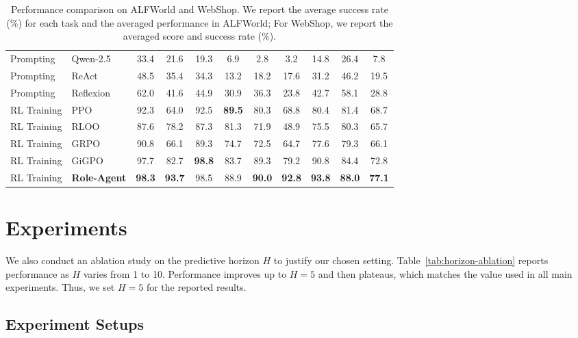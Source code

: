 \documentclass[11pt]{article}
\begin{document}
\begin{table}[t]
\begin{center}
{\begin{tabular}{ll|ccccccccc}
Prompting & Qwen-2.5 & 33.4 & 21.6 & 19.3 & 6.9 & 2.8 & 3.2 & \multicolumn{1}{c|}{14.8} & 26.4 & 7.8 \\
Prompting & ReAct & 48.5 & 35.4 & 34.3 & 13.2 & 18.2 & 17.6 & \multicolumn{1}{c|}{31.2} & 46.2 & 19.5 \\
Prompting & Reflexion & 62.0 & 41.6 & 44.9 & 30.9 & 36.3 & 23.8 & \multicolumn{1}{c|}{42.7} & 58.1 & 28.8 \\
RL Training & PPO & 92.3 & 64.0 & 92.5 & \textbf{89.5} & 80.3 & 68.8 & \multicolumn{1}{c|}{80.4} & 81.4 & 68.7 \\
RL Training & RLOO & 87.6 & 78.2 & 87.3 & 81.3 & 71.9 & 48.9 & \multicolumn{1}{c|}{75.5} & 80.3 & 65.7 \\
RL Training & GRPO & 90.8 & 66.1 & 89.3 & 74.7 & 72.5 & 64.7 & \multicolumn{1}{c|}{77.6} & 79.3 & 66.1 \\
RL Training & GiGPO & 97.7 & 82.7 & \textbf{98.8} & 83.7 & 89.3 & 79.2 & \multicolumn{1}{c|}{90.8} & 84.4 & 72.8 \\
\rowcolor{gray!10}
RL Training & \textbf{Role-Agent} & \textbf{98.3} & \textbf{93.7} & 98.5 & 88.9  & \textbf{90.0} & \textbf{92.8} & \multicolumn{1}{c|}{\textbf{93.8}} & \textbf{88.0} & \textbf{77.1} \\ 
\bottomrule[1pt] 
\end{tabular}} 
\vspace{-0.2cm}
\caption{Performance comparison on ALFWorld and WebShop. We report the average success rate (\%) for each task and the averaged performance in ALFWorld; For WebShop, we report the averaged score and success rate (\%).}\label{tab:1}
\end{center}
\vspace{-0.3cm} 
\end{table}

\section{Experiments}

We also conduct an ablation study on the predictive horizon $H$ to justify our chosen setting.
Table~\ref{tab:horizon-ablation} reports performance as $H$ varies from 1 to 10.
Performance improves up to $H=5$ and then plateaus, which matches the value used in all main experiments.
Thus, we set $H=5$ for the reported results.
\subsection{Experiment Setups}
\end{document}
